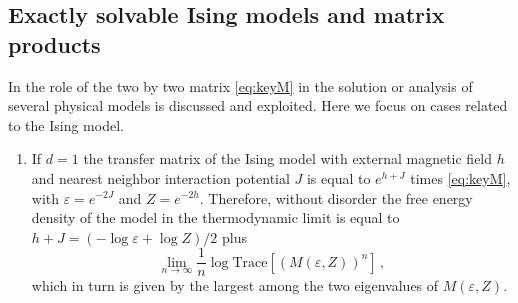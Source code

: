 \documentclass[reqno,11pt]{amsart}
\numberwithin{equation}{section}
\newcommand{\gep}{\varepsilon}       %
\begin{document}
\subsection{Exactly solvable Ising models and matrix products}
\label{sec:Ising}

In \cite{cf:CPV,cf:DH} the role of the two by two matrix \eqref{eq:keyM} in the solution or analysis of several physical models is discussed and exploited. 
Here we focus on cases related to  the Ising model. 

\begin{enumerate}[start=1,label={(I\arabic*)},leftmargin=*]
\item \label{Is1} If $d=1$  the transfer matrix of the  Ising model with external magnetic field $h$ and nearest neighbor interaction potential $J$ is equal to  $e^{h+J}$ times \eqref{eq:keyM}, with $\gep= e^{-2J}$ and $Z=e^{-2h}$. Therefore, 
without disorder the free energy density of the model in the thermodynamic limit is equal to $h+J= (-\log \gep + \log Z)/2$ plus
\begin{equation}
	\lim_{n \to \infty}
	\frac{1}{n}
	\log
	\mathrm{Trace}
	\left[ \left(M\left( \varepsilon, Z \right) \right) ^n\right]
	\, ,
\end{equation}
which in turn is given by the largest among the two eigenvalues of $M( \varepsilon, Z)$.


\end{enumerate}
\end{document}
